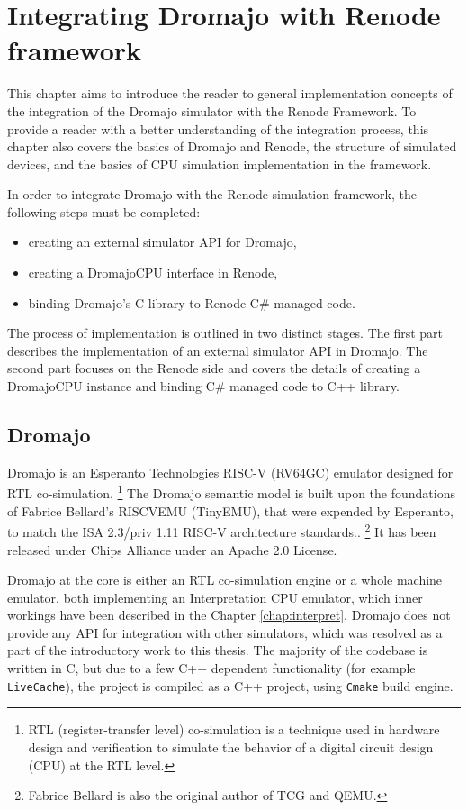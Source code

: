 
\chapter{Integrating Dromajo with Renode framework}

This chapter aims to introduce the reader to general implementation concepts of the integration of the Dromajo simulator with the Renode Framework.
To provide a reader with a better understanding of the integration process, this chapter also covers
the basics of Dromajo and Renode, the structure of simulated devices, and the basics of CPU simulation
implementation in the framework.

In order to integrate Dromajo with the Renode simulation framework, the following steps must be completed:
\begin{itemize}
    \item{creating an external simulator API for Dromajo,}
    \item{creating a DromajoCPU interface in Renode,}
    \item{binding Dromajo's C library to Renode C\# managed code.}
\end{itemize}

\noindent
The process of implementation is outlined in two distinct stages. The first part describes the implementation of an
external simulator API in Dromajo. The second part focuses on the Renode side and covers the details of creating a
DromajoCPU instance and binding C\# managed code to C++ library.

\section{Dromajo}

Dromajo is an Esperanto Technologies RISC-V (RV64GC) emulator designed for RTL co-simulation.%
\footnote{RTL (register-transfer level) co-simulation is a technique used in hardware design and verification to
simulate the behavior of a digital circuit design (CPU) at the RTL level.}
The Dromajo semantic model is built upon the foundations of Fabrice Bellard's RISCVEMU (TinyEMU), that were expended by
Esperanto, to match the ISA 2.3/priv 1.11 RISC-V architecture standards.\cite{Dromajo}.%
\footnote{Fabrice Bellard is also the original author of TCG and QEMU.}
It has been released under Chips Alliance
\cite{ChipsAlliance} under an Apache 2.0 License.

Dromajo at the core is either an RTL co-simulation engine or a whole machine emulator, both implementing an
Interpretation CPU emulator, which inner workings have been described in the Chapter \ref{chap:interpret}. Dromajo does not provide any API
for integration with other simulators, which was resolved as a part of the introductory work to this thesis. The majority of the
codebase is written in C, but due to a few C++ dependent functionality (for example \texttt{LiveCache}), the project is
compiled as a C++ project, using \texttt{Cmake} build engine.


